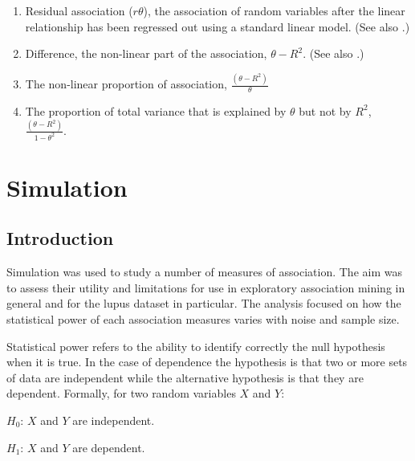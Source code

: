 \documentclass[a4paper, 12pt]{report}
\begin{document}
\begin{enumerate}
\item Residual association ($r \theta$), the association of random variables after the linear relationship has been regressed out using a standard linear model. (See also \citet{energy2013}.) %
\item Difference, the non-linear part of the association, $\theta - R^2$. (See also \citet{mic2011}.)
\item The non-linear proportion of association, $\frac{(\theta-R^2)}{\theta}$
\item The proportion of total variance that is explained by $\theta$ but not by $R^2$, $\frac{(\theta-R^2)}{1 -\theta^2}$.
\end{enumerate}

\chapter{Simulation}

\section{Introduction}
Simulation was used to study a number of measures of association. The aim was to assess their utility and limitations for use in exploratory association mining in general and for the lupus dataset in particular. The analysis focused on how the statistical power of each association measures varies with noise and sample size.

Statistical power refers to the ability to identify correctly the null hypothesis when it is true. In the case of dependence the hypothesis is that two or more sets of data are independent while the alternative hypothesis is that they are dependent. Formally, for two random variables $X$ and $Y$: 
 \newline

$H_0$: $X$ and $Y$ are independent.

$H_1$: $X$ and $Y$ are dependent.
\newline

\end{document}

